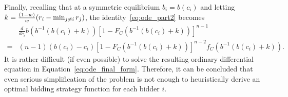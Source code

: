 Finally, recalling that at a symmetric equilibrium $b_i=b(c_i)$ and letting $k=\nobreak\frac{(1-w)}{w}(r_i-\min_{j\neq i}r_j)$, the identity~\eqref{eq:ode_part2} becomes
\begin{align}
	\label{eq:ode_final_form}
	&\frac{d}{dc_i}b\left( b^{-1}(b(c_i) + k) \right) \left[ 1 - F_C(b^{-1}(b(c_i)+k)) \right]^{n-1} \nonumber\\
	= &(n-1)(b(c_i)-c_i)\left[ 1 - F_C(b^{-1}(b(c_i)+k)) \right]^{n-2} f_C(b^{-1}(b(c_i)+k)).
\end{align}
It is rather difficult (if even possible) to solve the resulting ordinary differential equation in Equation~\eqref{eq:ode_final_form}. Therefore, it can be concluded that even serious simplification of the problem is not enough to heuristically derive an optimal bidding strategy function for each bidder $i$.

